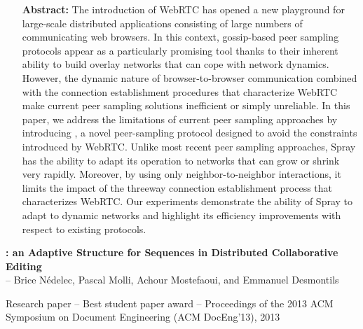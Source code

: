 \begin{itemize}
\item [\textbf{Abstract:}] {\small The introduction of WebRTC has opened a new
    playground for large-scale distributed applications consisting of large
    numbers of communicating web browsers. In this context, gossip-based peer
    sampling protocols appear as a particularly promising tool thanks to their
    inherent ability to build overlay networks that can cope with network
    dynamics. However, the dynamic nature of browser-to-browser communication
    combined with the connection establishment procedures that characterize
    WebRTC make current peer sampling solutions inefficient or simply
    unreliable. In this paper, we address the limitations of current peer
    sampling approaches by introducing \SPRAY, a novel peer-sampling protocol
    designed to avoid the constraints introduced by WebRTC. Unlike most recent
    peer sampling approaches, Spray has the ability to adapt its operation to
    networks that can grow or shrink very rapidly. Moreover, by using only
    neighbor-to-neighbor interactions, it limits the impact of the threeway
    connection establishment process that characterizes WebRTC. Our experiments
    demonstrate the ability of Spray to adapt to dynamic networks and highlight
    its efficiency improvements with respect to existing protocols.}
\end{itemize}



\noindent \textbf{\LSEQ: an Adaptive Structure for Sequences in Distributed
  Collaborative Editing}\\
\indent -- Brice Nédelec, Pascal Molli, Achour Mostefaoui, and Emmanuel
Desmontils

\noindent Research paper -- Best student paper award -- Proceedings of the 2013
ACM Symposium on Document Engineering (ACM DocEng'13), 2013

